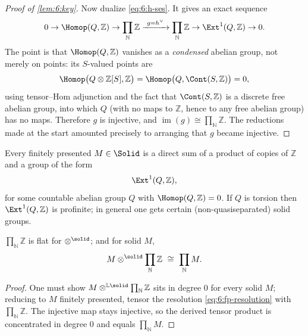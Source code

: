 \begin{proof}[Proof of \cref{lem:6:key}]
Now dualize \eqref{eq:6:h-ses}. It gives an exact sequence
\begin{equation*}
0\to\Homop(Q,\mathbb{Z})\to\prod_{\mathbb{N}}\mathbb{Z}\xrightarrow{\ g=h^{\vee}\ }
\prod_{\mathbb{N}}\mathbb{Z}\to\Ext^{1}(Q,\mathbb{Z})\to0 .
\end{equation*}
The point is that $\Homop(Q,\mathbb{Z})$ vanishes as a \emph{condensed} abelian
group, not merely on points: its $S$-valued points are
\begin{equation*}
\Homop\bigl(Q\otimes\mathbb{Z}[S],\mathbb{Z}\bigr)
=\Homop\bigl(Q,\Cont(S,\mathbb{Z})\bigr)=0,
\end{equation*}
using tensor--Hom adjunction and the fact that $\Cont(S,\mathbb{Z})$ is a discrete
free abelian group, into which $Q$ (with no maps to $\mathbb{Z}$, hence to any
free abelian group) has no maps. Therefore $g$ is injective, and
$\operatorname{im}(g)\cong\prod_{\mathbb{N}}\mathbb{Z}$. The reductions made at the
start amounted precisely to arranging that $g$ became injective.
\end{proof}

\begin{corollary}
\label{cor:6:fp-classification}
Every finitely presented $M\in\Solid$ is a direct sum of a product of copies of
$\mathbb{Z}$ and a group of the form
\begin{equation*}
\Ext^{1}(Q,\mathbb{Z}),
\end{equation*}
for some countable abelian group $Q$ with $\Homop(Q,\mathbb{Z})=0$. If $Q$ is
torsion then $\Ext^{1}(Q,\mathbb{Z})$ is profinite; in general one gets certain
(non-quasiseparated) solid groups.
\end{corollary}

\begin{corollary}
\label{cor:6:flat}
$\prod_{\mathbb{N}}\mathbb{Z}$ is flat for $\otimes^{\solid}$; and for solid $M$,
\begin{equation*}
M\otimes^{\solid}\prod_{\mathbb{N}}\mathbb{Z}\ \cong\ \prod_{\mathbb{N}}M .
\end{equation*}
\end{corollary}

\begin{proof}
One must show $M\otimes^{\mathbb{L}\solid}\prod_{\mathbb{N}}\mathbb{Z}$ sits in
degree $0$ for every solid $M$; reducing to $M$ finitely presented, tensor the
resolution \eqref{eq:6:fp-resolution} with $\prod_{\mathbb{N}}\mathbb{Z}$. The
injective map stays injective, so the derived tensor product is concentrated in
degree $0$ and equals $\prod_{\mathbb{N}}M$.
\end{proof}

